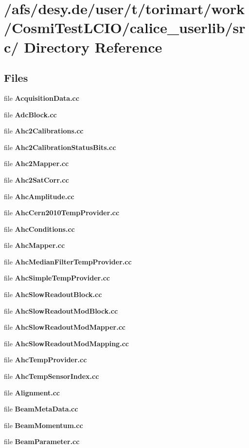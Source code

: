 \section{/afs/desy.de/user/t/torimart/work/CosmiTestLCIO/calice\_\-userlib/src/ Directory Reference}
\label{dir_93ce9fa9a1b0f4d1db89ce4de6453d6d}
\subsection*{Files}
\begin{DoxyCompactItemize}
\item 
file {\bfseries AcquisitionData.cc}
\item 
file {\bfseries AdcBlock.cc}
\item 
file {\bfseries Ahc2Calibrations.cc}
\item 
file {\bfseries Ahc2CalibrationStatusBits.cc}
\item 
file {\bfseries Ahc2Mapper.cc}
\item 
file {\bfseries Ahc2SatCorr.cc}
\item 
file {\bfseries AhcAmplitude.cc}
\item 
file {\bfseries AhcCern2010TempProvider.cc}
\item 
file {\bfseries AhcConditions.cc}
\item 
file {\bfseries AhcMapper.cc}
\item 
file {\bfseries AhcMedianFilterTempProvider.cc}
\item 
file {\bfseries AhcSimpleTempProvider.cc}
\item 
file {\bfseries AhcSlowReadoutBlock.cc}
\item 
file {\bfseries AhcSlowReadoutModBlock.cc}
\item 
file {\bfseries AhcSlowReadoutModMapper.cc}
\item 
file {\bfseries AhcSlowReadoutModMapping.cc}
\item 
file {\bfseries AhcTempProvider.cc}
\item 
file {\bfseries AhcTempSensorIndex.cc}
\item 
file {\bfseries Alignment.cc}
\item 
file {\bfseries BeamMetaData.cc}
\item 
file {\bfseries BeamMomentum.cc}
\item 
file {\bfseries BeamParameter.cc}
\item 

\end{DoxyCompactItemize}
